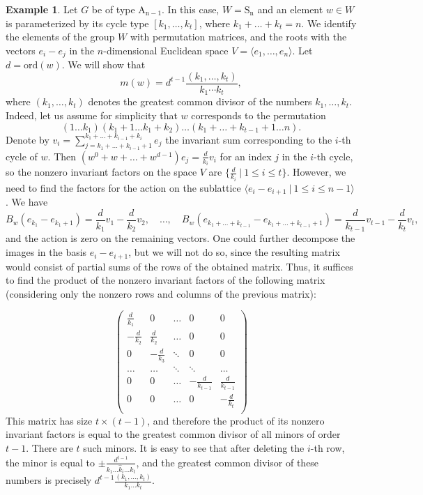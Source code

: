 \documentclass[a4paper,12pt]{amsart}
\theoremstyle{plain}
\theoremstyle{definition}
\newtheorem{example}{Example}
\newcommand{\ord}{\mathrm{ord}}
\begin{document}
\begin{example}
Let $G$ be of type $\operatorname{A_{n-1}}$. In this case, $W=\operatorname{S_n}$ and an element $w\in W$ is parameterized by its cycle type $[k_1,\ldots,k_t]$, where $k_1+\ldots+k_t=n$.
We identify the elements of the group $W$ with permutation matrices, and the roots with the vectors $e_i-e_j$ in the $n$-dimensional Euclidean space $V=\langle e_1,\ldots,e_n\rangle$.
Let $d=\ord(w)$. We will show that
$$
m(w)=d^{t-1}\frac{(k_1,\ldots,k_t)}{k_1\cdots k_t},
$$
where $(k_1,\ldots,k_t)$ denotes the greatest common divisor of the numbers $k_1,\ldots,k_t$.
Indeed, let us assume for simplicity that $w$ corresponds to the permutation
$$
(1\ldots k_1)(k_1+1\ldots k_1+k_2)\ldots(k_1+\ldots+k_{t-1}+1\ldots n).
$$
Denote by $v_i=\sum\limits_{j=k_1+\ldots+k_{i-1}+1}^{k_1+\ldots+k_{i-1}+k_i}e_j$ the invariant sum corresponding to the $i$-th cycle of $w$.
Then $(w^0+w+\ldots+w^{d-1})e_j=\frac{d}{k_i}v_i$ for an index $j$ in the $i$-th cycle, so the nonzero invariant factors on the space $V$ are $\{\frac{d}{k_i}~|~1\leq i\leq t\}$. However, we need to find the factors for the action on the sublattice $\langle e_i-e_{i+1}~|~1\leq i\leq n-1\rangle$.
We have
$$
B_w(e_{k_1}-e_{k_1+1})=\frac{d}{k_1}v_1-\frac{d}{k_2}v_2,\quad \ldots, \quad
B_w(e_{k_{1}+\dots+k_{t-1}}-e_{k_{1}+\dots+k_{t-1}+1})=\frac{d}{k_{t-1}}v_{t-1}-\frac{d}{k_t}v_t,
$$
and the action is zero on the remaining vectors. One could further decompose the images in the basis $e_i-e_{i+1}$, but we will not do so, since the resulting matrix would consist of partial sums of the rows of the obtained matrix. Thus, it suffices to find the product of the nonzero invariant factors of the following matrix (considering only the nonzero rows and columns of the previous matrix):

\[\left(\begin{matrix}
\frac{d}{k_1} & 0 & \ldots & 0 & 0\\
-\frac{d}{k_2} & \frac{d}{k_2} & \ldots & 0 & 0\\
0 & -\frac{d}{k_3} &  \ddots & 0 & 0 \\
\ldots & \ldots &  \ddots & \ddots & \ldots\\
0 & 0 &\ldots &  -\frac{d}{k_{t-1}} & \frac{d}{k_{t-1}} \\
0 & 0 &\ldots &  0 & -\frac{d}{k_{t}} \\
\end{matrix}\right)\]
This matrix has size $t\times{(t-1)}$, and therefore the product of its nonzero invariant factors is equal to the greatest common divisor of all minors of order $t-1$. There are $t$ such minors.
It is easy to see that after deleting the $i$-th row, the minor is equal to $\pm\frac{d^{t-1}}{k_1\ldots \hat{k}_i\ldots k_t}$, and the greatest common divisor of these numbers is precisely $d^{t-1}\frac{(k_1,\ldots,k_t)}{k_1\ldots k_t}$.
\end{example}
\end{document}

